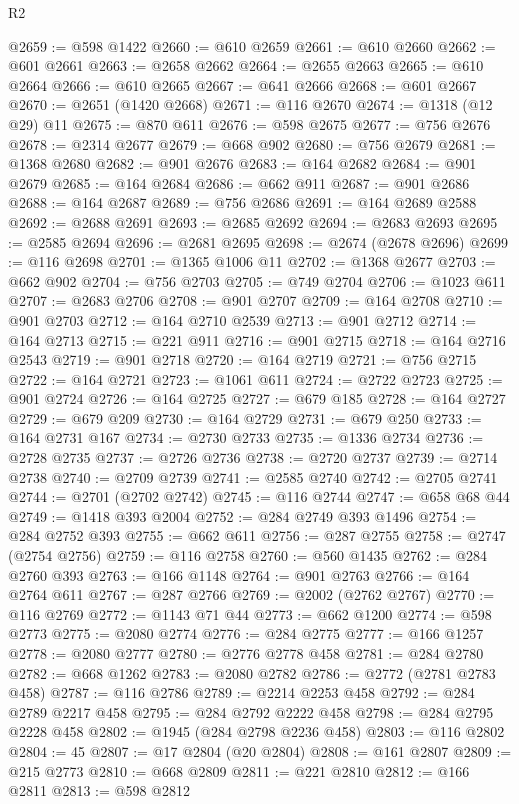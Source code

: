 \begin{lexlean}{R2}
\begin{coremodule}
@2659 := @598 @1422
@2660 := @610 @2659
@2661 := @610 @2660
@2662 := @601 @2661
@2663 := @2658 @2662
@2664 := @2655 @2663
@2665 := @610 @2664
@2666 := @610 @2665
@2667 := @641 @2666
@2668 := @601 @2667
@2670 := @2651 (@1420 @2668)
@2671 := @116 @2670
@2674 := @1318 (@12 @29) @11
@2675 := @870 @611
@2676 := @598 @2675
@2677 := @756 @2676
@2678 := @2314 @2677
@2679 := @668 @902
@2680 := @756 @2679
@2681 := @1368 @2680
@2682 := @901 @2676
@2683 := @164 @2682
@2684 := @901 @2679
@2685 := @164 @2684
@2686 := @662 @911
@2687 := @901 @2686
@2688 := @164 @2687
@2689 := @756 @2686
@2691 := @164 @2689 @2588
@2692 := @2688 @2691
@2693 := @2685 @2692
@2694 := @2683 @2693
@2695 := @2585 @2694
@2696 := @2681 @2695
@2698 := @2674 (@2678 @2696)
@2699 := @116 @2698
@2701 := @1365 @1006 @11
@2702 := @1368 @2677
@2703 := @662 @902
@2704 := @756 @2703
@2705 := @749 @2704
@2706 := @1023 @611
@2707 := @2683 @2706
@2708 := @901 @2707
@2709 := @164 @2708
@2710 := @901 @2703
@2712 := @164 @2710 @2539
@2713 := @901 @2712
@2714 := @164 @2713
@2715 := @221 @911
@2716 := @901 @2715
@2718 := @164 @2716 @2543
@2719 := @901 @2718
@2720 := @164 @2719
@2721 := @756 @2715
@2722 := @164 @2721
@2723 := @1061 @611
@2724 := @2722 @2723
@2725 := @901 @2724
@2726 := @164 @2725
@2727 := @679 @185
@2728 := @164 @2727
@2729 := @679 @209
@2730 := @164 @2729
@2731 := @679 @250
@2733 := @164 @2731 @167
@2734 := @2730 @2733
@2735 := @1336 @2734
@2736 := @2728 @2735
@2737 := @2726 @2736
@2738 := @2720 @2737
@2739 := @2714 @2738
@2740 := @2709 @2739
@2741 := @2585 @2740
@2742 := @2705 @2741
@2744 := @2701 (@2702 @2742)
@2745 := @116 @2744
@2747 := @658 @68 @44
@2749 := @1418 @393 @2004
@2752 := @284 @2749 @393 @1496
@2754 := @284 @2752 @393
@2755 := @662 @611
@2756 := @287 @2755
@2758 := @2747 (@2754 @2756)
@2759 := @116 @2758
@2760 := @560 @1435
@2762 := @284 @2760 @393
@2763 := @166 @1148
@2764 := @901 @2763
@2766 := @164 @2764 @611
@2767 := @287 @2766
@2769 := @2002 (@2762 @2767)
@2770 := @116 @2769
@2772 := @1143 @71 @44
@2773 := @662 @1200
@2774 := @598 @2773
@2775 := @2080 @2774
@2776 := @284 @2775
@2777 := @166 @1257
@2778 := @2080 @2777
@2780 := @2776 @2778 @458
@2781 := @284 @2780
@2782 := @668 @1262
@2783 := @2080 @2782
@2786 := @2772 (@2781 @2783 @458)
@2787 := @116 @2786
@2789 := @2214 @2253 @458
@2792 := @284 @2789 @2217 @458
@2795 := @284 @2792 @2222 @458
@2798 := @284 @2795 @2228 @458
@2802 := @1945 (@284 @2798 @2236 @458)
@2803 := @116 @2802
@2804 := 45
@2807 := @17 @2804 (@20 @2804)
@2808 := @161 @2807
@2809 := @215 @2773
@2810 := @668 @2809
@2811 := @221 @2810
@2812 := @166 @2811
@2813 := @598 @2812

\end{coremodule}
\end{lexlean}
